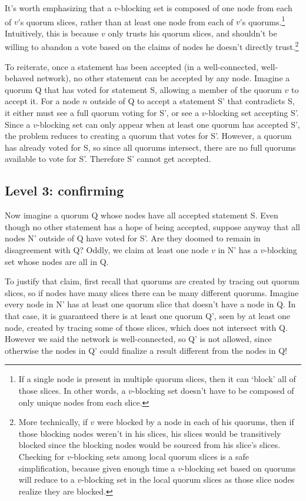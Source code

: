 It's worth emphasizing that a $v$-blocking set is composed of one node from each of $v$'s quorum slices, rather than at least one node from each of $v$'s quorums.\footnote{If a single node is present in multiple quorum slices, then it can `block' all of those slices. In other words, a $v$-blocking set doesn't have to be composed of only unique nodes from each slice.} Intuitively, this is because $v$ only trusts his quorum slices, and shouldn't be willing to abandon a vote based on the claims of nodes he doesn't directly trust.\footnote{More technically, if $v$ were blocked by a node in each of his quorums, then if those blocking nodes weren't in his slices, his slices would be transitively blocked since the blocking nodes would be sourced from his slice's slices. Checking for $v$-blocking sets among local quorum slices is a safe simplification, because given enough time a $v$-blocking set based on quorums will reduce to a $v$-blocking set in the local quorum slices as those slice nodes realize they are blocked.}

To reiterate, once a statement has been accepted (in a well-connected, well-behaved network), no other statement can be accepted by any node. Imagine a quorum Q that has voted for statement S, allowing a member of the quorum $v$ to accept it. For a node $n$ outside of Q to accept a statement S' that contradicts S, it either must see a full quorum voting for S', or see a $v$-blocking set accepting S'. Since a $v$-blocking set can only appear when at least one quorum has accepted S', the problem reduces to creating a quorum that votes for S'. However, a quorum has already voted for S, so since all quorums intersect, there are no full quorums available to vote for S'. Therefore S' cannot get accepted.

\subsection{Level 3: confirming}
\label{subsec:consensus-lv3-confirming}

Now imagine a quorum Q whose nodes have all accepted statement S. Even though no other statement has a hope of being accepted, suppose anyway that all nodes N' outside of Q have voted for S'. Are they doomed to remain in disagreement with Q? Oddly, we claim at least one node $v$ in N' has a $v$-blocking set whose nodes are all in Q.

To justify that claim, first recall that quorums are created by tracing out quorum slices, so if nodes have many slices there can be many different quorums. Imagine every node in N' has at least one quorum slice that doesn't have a node in Q. In that case, it is guaranteed there is at least one quorum Q', seen by at least one node, created by tracing some of those slices, which does not intersect with Q. However we said the network is well-connected, so Q' is not allowed, since otherwise the nodes in Q' could finalize a result different from the nodes in Q!

